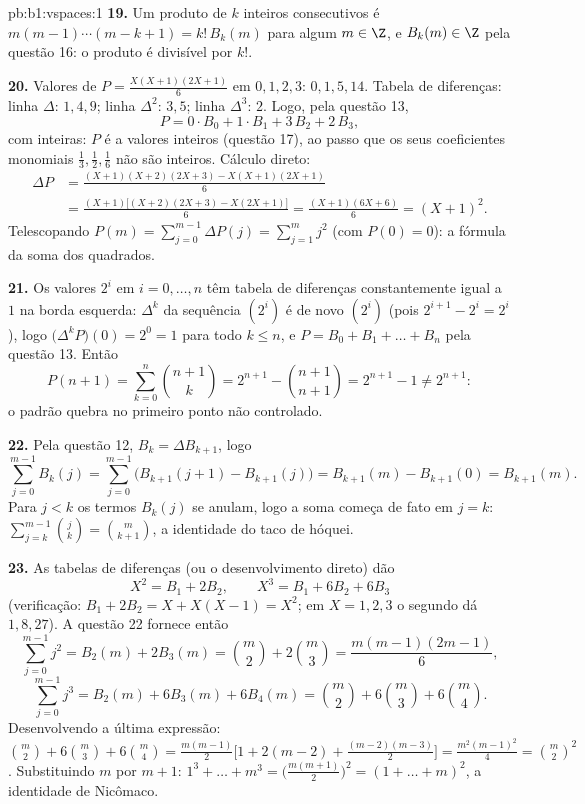 \begin{solution}{pb:b1:vspaces:1}
\textbf{19.} Um produto de $k$ inteiros consecutivos é $m(m-1)
\cdots(m-k+1) = k!\,B_k(m)$ para
algum $m \in \Z$, e $B_k(m) \in
\Z$ pela questão 16: o produto é divisível por
$k!$.

\textbf{20.} Valores de $P = \frac{X(X+1)(2X+1)}{6}$ em $0,1,2,3$: $0, 1, 5, 14$. Tabela de
diferenças: linha $\Delta$: $1, 4, 9$; linha $\Delta^2$: $3, 5$; linha
$\Delta^3$: $2$. Logo, pela questão 13,
\[
P = 0\cdot B_0 + 1\cdot B_1 + 3\,B_2 + 2\,B_3 ,
\]
com  inteiras: $P$ é a valores inteiros (questão 17),
ao passo que os seus coeficientes monomiais $\frac13, \frac12, \frac16$ não são
inteiros. Cálculo direto:
\begin{align*}
\Delta P &= \frac{(X+1)(X+2)(2X+3) - X(X+1)(2X+1)}{6} \\
&= \frac{(X+1)\bigl[(X+2)(2X+3) - X(2X+1)\bigr]}{6}
= \frac{(X+1)(6X+6)}{6} = (X+1)^2 .
\end{align*}
Telescopando $P(m) = \sum_{j=0}^{m-1}\Delta P(j) = \sum_{j=1}^{m}
j^2$ (com $P(0) = 0$): a fórmula da soma dos quadrados.

\textbf{21.} Os valores $2^i$ em $i = 0, \dots, n$ têm tabela de diferenças
constantemente igual a $1$ na borda esquerda: $\Delta^k$ da sequência
$(2^i)$ é de novo $(2^i)$ (pois $2^{i+1} - 2^i = 2^i$), logo $\bigl(\Delta^k P\bigr)(0) = 2^0 = 1$ para todo $k \leq n$,
e $P =
B_0 + B_1 + \dots + B_n$ pela questão 13. Então
\[
P(n+1) = \sum_{k=0}^{n}\binom{n+1}{k}
= 2^{n+1} - \binom{n+1}{n+1} = 2^{n+1} - 1 \neq 2^{n+1}:
\]
o padrão quebra no primeiro ponto não controlado.

\textbf{22.} Pela questão 12, $B_k = \Delta B_{k+1}$, logo
\[
\sum_{j=0}^{m-1} B_k(j)
= \sum_{j=0}^{m-1}\bigl(B_{k+1}(j+1) - B_{k+1}(j)\bigr)
= B_{k+1}(m) - B_{k+1}(0) = B_{k+1}(m).
\]
Para $j < k$ os termos $B_k(j)$ se anulam, logo a soma começa de
fato em $j = k$: $\sum_{j=k}^{m-1}\binom jk = \binom m{k+1}$, a identidade do taco de hóquei.

\textbf{23.} As tabelas de diferenças (ou o desenvolvimento direto)
dão
\[
X^2 = B_1 + 2 B_2, \qquad X^3 = B_1 + 6 B_2 + 6 B_3
\]
(verificação: $B_1 + 2B_2 = X + X(X-1) = X^2$; em $X = 1, 2, 3$ o segundo dá $1, 8, 27$). A questão 22
fornece então
\[
\sum_{j=0}^{m-1} j^2 = B_2(m) + 2B_3(m)
= \binom m2 + 2\binom m3 = \frac{m(m-1)(2m-1)}{6},
\]
\[
\sum_{j=0}^{m-1} j^3 = B_2(m) + 6B_3(m) + 6B_4(m)
= \binom m2 + 6\binom m3 + 6\binom m4 .
\]
Desenvolvendo a última expressão: $\binom m2 + 6\binom m3 + 6\binom
m4 = \frac{m(m-1)}{2}\bigl[1 + 2(m-2) +
\frac{(m-2)(m-3)}{2}\bigr] = \frac{m^2(m-1)^2}{4} = \binom m2^2$. Substituindo $m$ por
$m + 1$: $1^3 + \dots + m^3 =
\bigl(\frac{m(m+1)}2\bigr)^2 = (1 + \dots + m)^2$, a identidade de Nicômaco.


\end{solution}
